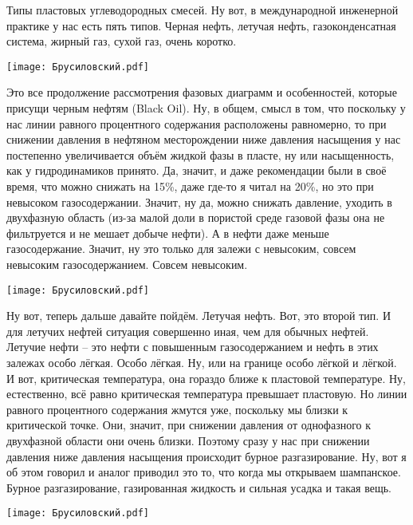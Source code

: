 \documentclass[main.tex]{subfiles}
\begin{document}
Типы пластовых углеводородных смесей.
Ну вот, в международной инженерной практике у нас есть пять типов.
Черная нефть, летучая нефть, газоконденсатная система, жирный газ, сухой газ, очень коротко.

\begin{center}
\texttt{[image: Брусиловский.pdf]}
\end{center}

Это все продолжение рассмотрения фазовых диаграмм и особенностей, которые присущи черным нефтям (Black Oil).
Ну, в общем, смысл в том, что поскольку у нас линии равного процентного содержания расположены равномерно, то при снижении давления в нефтяном месторождении ниже давления насыщения у нас постепенно увеличивается объём жидкой фазы в пласте, ну или насыщенность, как у гидродинамиков принято.
Да, значит, и даже рекомендации были в своё время, что можно снижать на 15\%, даже где-то я читал на 20\%, но это при невысоком газосодержании.
Значит, ну да, можно снижать давление, уходить в двухфазную область (из-за малой доли в пористой среде газовой фазы она не фильтруется и не мешает добыче нефти).
А в нефти даже меньше газосодержание.
Значит, ну это только для залежи с невысоким, совсем невысоким газосодержанием.
Совсем невысоким.

\begin{center}
\texttt{[image: Брусиловский.pdf]}
\end{center}

Ну вот, теперь дальше давайте пойдём.
Летучая нефть.
Вот, это второй тип.
И для летучих нефтей ситуация совершенно иная, чем для обычных нефтей.
Летучие нефти -- это нефти с повышенным газосодержанием и нефть в этих залежах особо лёгкая.
Особо лёгкая.
Ну, или на границе особо лёгкой и лёгкой.
И вот, критическая температура, она гораздо ближе к пластовой температуре.
Ну, естественно, всё равно критическая температура превышает пластовую.
Но линии равного процентного содержания жмутся уже, поскольку мы близки к критической точке.
Они, значит, при снижении давления от однофазного к двухфазной области они очень близки.
Поэтому сразу у нас при снижении давления ниже давления насыщения происходит бурное разгазирование.
Ну, вот я об этом говорил и аналог приводил это то, что когда мы открываем шампанское.
Бурное разгазирование, газированная жидкость и сильная усадка и такая вещь.

\begin{center}
\texttt{[image: Брусиловский.pdf]}
\end{center}
\end{document}
